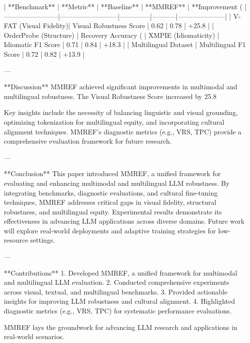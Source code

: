 | **Benchmark**         | **Metric**               | **Baseline** | **MMREF** | **Improvement (%
|------------------------|--------------------------|--------------|-----------|---------------------|  
| V-FAT (Visual Fidelity)| Visual Robustness Score | 0.62         | 0.78      | +25.8               |  
| OrderProbe (Structure) | Recovery Accuracy (%
| XMPIE (Idiomaticity)   | Idiomatic F1 Score      | 0.71         | 0.84      | +18.3               |  
| Multilingual Dataset   | Multilingual F1 Score   | 0.72         | 0.82      | +13.9               |  

---

**Discussion**  
MMREF achieved significant improvements in multimodal and multilingual robustness. The Visual Robustness Score increased by 25.8%

Key insights include the necessity of balancing linguistic and visual grounding, optimizing tokenization for multilingual equity, and incorporating cultural alignment techniques. MMREF's diagnostic metrics (e.g., VRS, TPC) provide a comprehensive evaluation framework for future research.  

---

**Conclusion**  
This paper introduced MMREF, a unified framework for evaluating and enhancing multimodal and multilingual LLM robustness. By integrating benchmarks, diagnostic evaluations, and cultural fine-tuning techniques, MMREF addresses critical gaps in visual fidelity, structural robustness, and multilingual equity. Experimental results demonstrate its effectiveness in advancing LLM applications across diverse domains. Future work will explore real-world deployments and adaptive training strategies for low-resource settings.  

---

**Contributions**  
1. Developed MMREF, a unified framework for multimodal and multilingual LLM evaluation.  
2. Conducted comprehensive experiments across visual, textual, and multilingual benchmarks.  
3. Provided actionable insights for improving LLM robustness and cultural alignment.  
4. Highlighted diagnostic metrics (e.g., VRS, TPC) for systematic performance evaluations.  

MMREF lays the groundwork for advancing LLM research and applications in real-world scenarios.